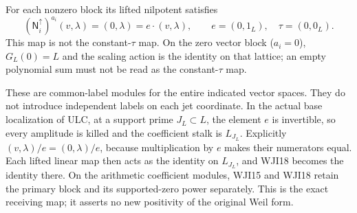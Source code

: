 For each nonzero block its lifted nilpotent satisfies
\begin{equation}\tag{WJI18}
 (\mathsf N_i^\uparrow)^{a_i}(v,\lambda)
     =(0,\lambda)=e\cdot(v,\lambda),
 \qquad e=(0,1_L),\quad\tau=(0,0_L).
\end{equation}
This map is not the constant-$\tau$ map. On the zero vector
block ($a_i=0$), $G_L(0)=L$ and the scaling action is the
identity on that lattice; an empty polynomial sum must not
be read as the constant-$\tau$ map.

These are common-label modules for the entire indicated
vector spaces. They do not introduce independent labels on
each jet coordinate. In the actual base localization of ULC,
at a support prime $J_L\subset L$, the element $e$ is
invertible, so every amplitude is killed and the coefficient
stalk is $L_{J_L}$. Explicitly
$(v,\lambda)/e=(0,\lambda)/e$, because multiplication
by $e$ makes their numerators equal. Each lifted linear
map then acts as the identity on $L_{J_L}$, and WJI18
becomes the identity there. On the arithmetic coefficient
modules, WJI15 and WJI18 retain the primary block and its
supported-zero power separately. This is the exact receiving
map; it asserts no new positivity of the original Weil form.
